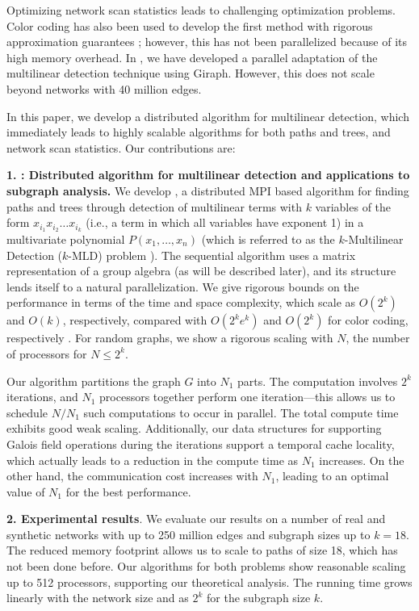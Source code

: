 Optimizing network scan statistics leads to challenging optimization problems.
Color coding has also been used to develop the first method with rigorous approximation
guarantees \cite{cadena:sdm17}; however, this has not been parallelized because of
its high memory overhead. In \cite{cadena:bigdata17}, we have developed a
parallel adaptation of the multilinear detection technique using Giraph. However,
this does not scale beyond networks with 40 million edges.

In this paper, we develop a distributed algorithm for multilinear detection,
which immediately leads to highly scalable algorithms for both paths and trees,
and network scan statistics.
Our contributions are:

\noindent
\textbf{1. \ouralgo{}: Distributed algorithm for multilinear detection
and applications to subgraph analysis.}
We develop \ouralgo{}, a distributed MPI based algorithm for finding
paths and trees through detection of
multilinear terms with $k$ variables of the form $x_{i_1}x_{i_2}\ldots x_{i_k}$ (i.e., a term in
which all variables have exponent 1) in a multivariate polynomial
$P(x_1,\ldots,x_n)$ (which is referred to as the $k$-Multilinear Detection (\textsc{$k$-MLD}) problem
\cite{koutis:icalp08, williams2009finding}). The sequential algorithm uses a matrix representation
of a group algebra (as will be described later), and its structure lends itself to a natural
parallelization.  We give rigorous bounds on the performance in terms of the time and
space complexity, which scale as
$O(2^k)$ and $O(k)$, respectively, compared with $O(2^ke^k)$ and $O(2^k)$ for
color coding, respectively \cite{zhao2012sahad, slota:icpp13, slota:ipdps14}.
For random graphs, we show a rigorous scaling with $N$, the number of processors for $N\leq 2^k$. 

Our algorithm partitions the graph $G$ into $N_1$ parts. The computation involves $2^k$
iterations, and $N_1$ processors together perform one iteration---this allows us to schedule
$N/N_1$ such computations to occur in parallel. The total compute time exhibits good weak scaling.
Additionally, our data structures for supporting Galois field operations
during the iterations support a temporal cache locality, which actually leads to a reduction
in the compute time as $N_1$ increases. On the other hand, the communication cost increases
with $N_1$, leading to an optimal value of $N_1$ for the best performance.


\noindent
\textbf{2. Experimental results}. We evaluate our results on a number of real and synthetic networks 
with up to 250 million edges and subgraph sizes up to $k=18$. The reduced memory footprint
allows us to scale to paths of size 18, which has not been done before.  Our algorithms for
both problems show reasonable scaling up to 512 processors, supporting our theoretical analysis. 
The running time grows linearly with the network size and as $2^k$ for the subgraph size $k$.

